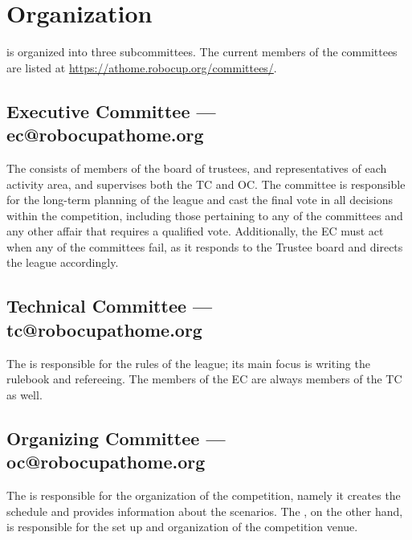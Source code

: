 \section{Organization}

\AtHome{} is organized into three subcommittees. The current members of the committees are listed at \url{https://athome.robocup.org/committees/}.

\subsection{Executive Committee --- ec@robocupathome.org}
\label{sec:ec}

The \EC{} consists of members of the board of trustees, and representatives of each activity area, and supervises both the TC and OC.
The committee is responsible for the long-term planning of the league and cast the final vote in all decisions within the competition, including those pertaining to any of the committees and any other affair that requires a qualified vote.
Additionally, the EC must act when any of the committees fail, as it responds to the Trustee board and directs the league accordingly.

\subsection{Technical Committee --- tc@robocupathome.org}
\label{sec:tc}

The \TC{} is responsible for the rules of the league; its main focus is writing the rulebook and refereeing.
The members of the EC are always members of the TC as well.

\subsection{Organizing Committee --- oc@robocupathome.org}
\label{sec:oc}

The \OC{} is responsible for the organization of the competition, namely it creates the schedule and provides information about the scenarios.
The \LOC{}, on the other hand, is responsible for the set up and organization of the competition venue.
